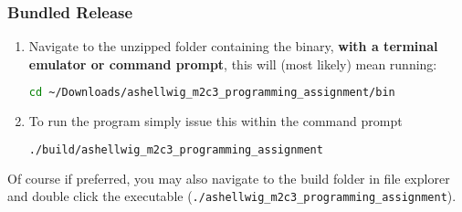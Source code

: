 \documentclass[a4paper, 11pt]{article}
\begin{document}
      \subsubsection{Bundled Release}
        \begin{enumerate}
          \item Navigate to the unzipped folder containing the binary,
            \textbf{with a terminal emulator or command prompt}, this will
            (most likely) mean running:
            \begin{lstlisting}[language=bash]
cd ~/Downloads/ashellwig_m2c3_programming_assignment/bin
            \end{lstlisting}
          \item To run the program simply issue this within the command
            prompt
            \begin{lstlisting}[language=bash]
./build/ashellwig_m2c3_programming_assignment
            \end{lstlisting}
        \end{enumerate}
        Of course if preferred, you may also navigate to the build folder in
          file explorer and double click the executable
          (\texttt{./ashellwig\_m2c3\_programming\_assignment}).



\end{document}
